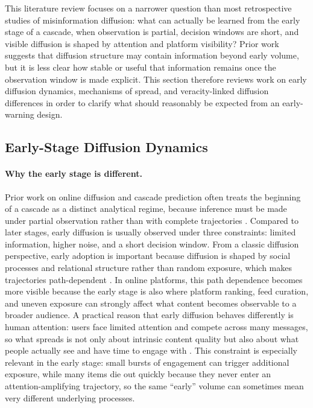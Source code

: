 This literature review focuses on a narrower question than most retrospective studies of misinformation diffusion: what can actually be learned from the early stage of a cascade, when observation is partial, decision windows are short, and visible diffusion is shaped by attention and platform visibility? Prior work suggests that diffusion structure may contain information beyond early volume, but it is less clear how stable or useful that information remains once the observation window is made explicit. This section therefore reviews work on early diffusion dynamics, mechanisms of spread, and veracity-linked diffusion differences in order to clarify what should reasonably be expected from an early-warning design.



\subsection{Early-Stage Diffusion Dynamics}
\paragraph{Why the early stage is different.}

Prior work on online diffusion and cascade prediction often treats the beginning of a cascade as a distinct analytical regime, because inference must be made under partial observation rather than with complete trajectories \citep{cheng_can_2014, szabo_predicting_2010, colbaugh_earlywarning_2012}. Compared to later stages, early diffusion is usually observed under three constraints: limited information, higher noise, and a short decision window. From a classic diffusion perspective, early adoption is important because diffusion is shaped by social processes and relational structure rather than random exposure, which makes trajectories path-dependent \citep{rogers_diffusion_2003}. In online platforms, this path dependence becomes more visible because the early stage is also where platform ranking, feed curation, and uneven exposure can strongly affect what content becomes observable to a broader audience. A practical reason that early diffusion behaves differently is human attention: users face limited attention and compete across many messages, so what spreads is not only about intrinsic content quality but also about what people actually see and have time to engage with \citep{lerman_information_2010, lerman_information_2016}. This constraint is especially relevant in the early stage: small bursts of engagement can trigger additional exposure, while many items die out quickly because they never enter an attention-amplifying trajectory, so the same ``early'' volume can sometimes mean very different underlying processes.
